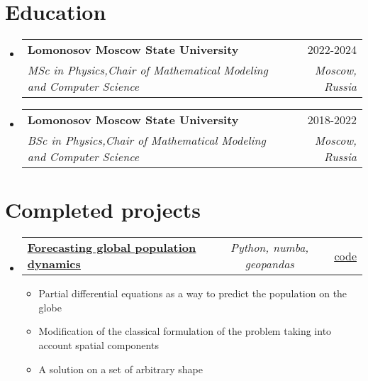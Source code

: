 \documentclass[a4paper,11pt]{article}
\makeatletter
\newcommand{\resumeItem}[1]{
  \item\small{#1}
}
\newcommand{\resumeItemListStart}{\begin{itemize}[rightmargin=0.11in]}
\newcommand{\resumeItemListEnd}{\end{itemize}}
\newcommand{\resumeTrioHeading}[3]{
  \item\small{
    \begin{tabular*}{0.96\textwidth}[t]{
      l@{\extracolsep{\fill}}c@{\extracolsep{\fill}}r
    }
      \textbf{#1} & \textit{#2} & #3
    \end{tabular*}
  }
}
\newcommand{\resumeQuadHeading}[4]{
  \item
  \begin{tabular*}{0.96\textwidth}[t]{l@{\extracolsep{\fill}}r}
    \textbf{#1} & #2 \\
    \textit{\small#3} & \textit{\small #4} \\
  \end{tabular*}
}
\newcommand{\resumeQuadHeadingChild}[2]{
  \item
  \begin{tabular*}{0.96\textwidth}[t]{l@{\extracolsep{\fill}}r}
    \textbf{\small#1} & {\small#2} \\
  \end{tabular*}
}
\newcommand{\resumeHeadingListStart}{
  \begin{itemize}[leftmargin=0.15in, label={}]
}
\newcommand{\resumeHeadingListEnd}{\end{itemize}}
\makeatother
\begin{document}




\section{Education}
  \resumeHeadingListStart{}
  
    \resumeQuadHeading{Lomonosov Moscow State University}{2022-2024}
    {MSc in Physics,Chair of Mathematical Modeling and Computer Science}{Moscow, Russia}

    \resumeQuadHeading{Lomonosov Moscow State University}{2018-2022}
    {BSc in Physics,Chair of Mathematical Modeling and Computer Science}{Moscow, Russia}

  \resumeHeadingListEnd{}




\section{Completed projects}

  \resumeHeadingListStart{}
        \resumeTrioHeading{\href{https://github.com/RepnikovPavel/GlobalDynamics}{\uline{Forecasting global population dynamics}}}{Python, numba, geopandas}{\href{https://github.com/RepnikovPavel/GlobalDynamics}{\uline{\faGithubSquare code}}}
    \resumeItemListStart{}
    \resumeItem{Partial differential equations as a way to predict the population on the globe}
    \resumeItem{Modification of the classical formulation of the problem taking into account spatial components}
    \resumeItem{A solution on a set of arbitrary shape}
    \resumeItemListEnd{}
    \resumeHeadingListEnd
\end{document}

